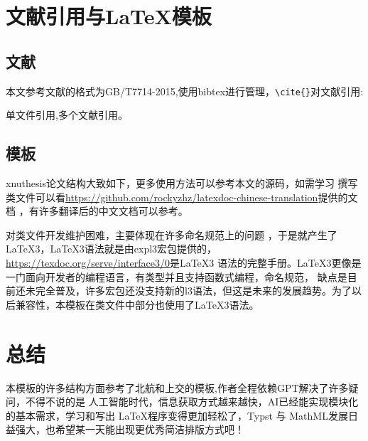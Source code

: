 \section{文献引用与\LaTeX 模板}
\subsection{文献}
本文参考文献的格式为GB/T7714-2015,使用bibtex进行管理，\verb|\cite{}|对文献引用:
\begin{center}

单文件引用\cite{Cheng1999},多个文献引用\cite{CSTAM1990,GBT2659,HBLZ2001,Hopkinson1999,Jiang1989,Jiang1998,Li2000,Li1999,LSC1957,WHO1970,Yu2001,Zhang1998}。
    
\end{center}
\subsection{模板}
xnuthesis论文结构大致如下，更多使用方法可以参考本文的源码，如需学习
撰写类文件可以看\url{https://github.com/rockyzhz/latexdoc-chinese-translation}提供的文档 ，有许多翻译后的中文文档可以参考。

\begin{figure}[p]
\centering

\end{figure}

\LaTeXe{}对类文件开发维护困难，主要体现在许多命名规范上的问题 ，于是就产生了\LaTeX 3，\LaTeX 3语法就是由expl3宏包提供的，\url{https://texdoc.org/serve/interface3/0}是\LaTeX 3 语法的完整手册。\LaTeX 3更像是一门面向开发者的编程语言，有类型并且支持函数式编程，命名规范，
缺点是目前还未完全普及，许多宏包还没支持新的l3语法，但这是未来的发展趋势。为了以后兼容性，本模板在类文件中部分也使用了\LaTeX3语法。

\section{总结}
本模板的许多结构方面参考了北航和上交的模板,作者全程依赖GPT解决了许多疑问，不得不说的是
人工智能时代，信息获取方式越来越快，AI已经能实现模块化的基本需求，学习和写出 \LaTeX 程序变得更加轻松了，Typst 与 MathML发展日益强大，也希望某一天能出现更优秀简洁排版方式吧！

\newpage

